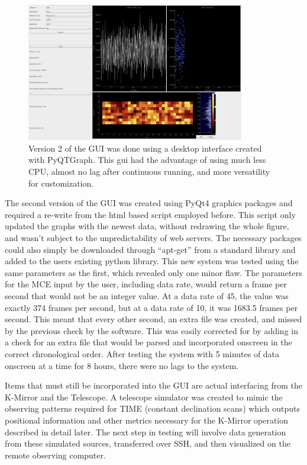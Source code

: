 \documentclass[manuscript]{aastex}
\begin{document}
\begin{figure}[H]
	\centering
	\captionsetup{width=0.85\textwidth}
	\includegraphics[width=0.85\textwidth]{gui2.png}%
	\caption[GUI Beta 2.0]{Version 2 of the GUI was done using a desktop interface created with {\sc PyQTGraph}. This gui had the advantage of using much less CPU, almost no lag after continuous running, and more versatility for customization.}%
	\label{fig:gui2}%
\end{figure}

The second version of the GUI was created using PyQt4 graphics packages and required a re-write from the html based script employed before. This script only updated the graphs with the newest data, without redrawing the whole figure, and wasn't subject to the unpredictability of web servers. The necessary packages could also simply be downloaded through ``apt-get'' from a standard library and added to the users existing python library. This new system was tested using the same parameters as the first, which revealed only one minor flaw. The parameters for the MCE input by the user, including data rate, would return a frame per second that would not be an integer value. At a data rate of 45, the value was exactly 374 frames per second, but at a data rate of 10, it was 1683.5 frames per second. This meant that every other second, an extra file was created, and missed by the previous check by the software. This was easily corrected for by adding in a check for an extra file that would be parsed and incorporated onscreen in the correct chronological order. After testing the system with 5 minutes of data onscreen at a time for 8 hours, there were no lags to the system. 

Items that must still be incorporated into the GUI are actual interfacing from the K-Mirror and the Telescope. A telescope simulator was created to mimic the observing patterns required for TIME (constant declination scans) which outputs positional information and other metrics necessary for the K-Mirror operation described in detail later. The next step in testing will involve data generation from these simulated sources, transferred over SSH, and then visualized on the remote observing computer. 
\end{document}

